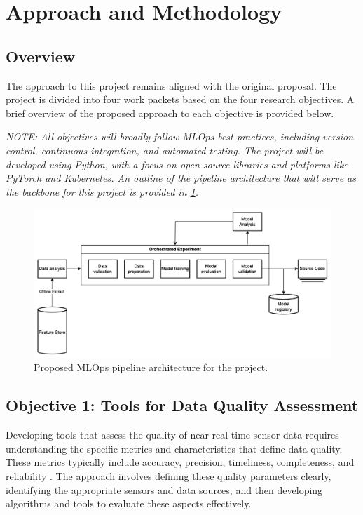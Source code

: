 \section{Approach and Methodology}

\subsection{Overview}

The approach to this project remains aligned with the original proposal. The project is divided into four work packets based on the four research objectives. A brief overview of the proposed approach to each objective is provided below.

    {\color{secondary-text-color} \textit{NOTE: All objectives will broadly follow MLOps best practices, including version control, continuous integration, and automated testing. The project will be developed using Python, with a focus on open-source libraries and platforms like PyTorch and Kubernetes. An outline of the pipeline architecture that will serve as the backbone for this project is provided in \ref{fig:mlops}.}}

\begin{figure}[h]
    \centering
    \includegraphics[scale=0.14]{figures/ml_ops.png}
    \caption{Proposed MLOps pipeline architecture for the project.}
    \label{fig:mlops}
\end{figure}

\subsection{Objective 1: Tools for Data Quality Assessment}

Developing tools that assess the quality of near real-time sensor data requires understanding the specific metrics and characteristics that define data quality. These metrics typically include accuracy, precision, timeliness, completeness, and reliability \cite{wangAccuracyWhatData1996}. The approach involves defining these quality parameters clearly, identifying the appropriate sensors and data sources, and then developing algorithms and tools to evaluate these aspects effectively.

